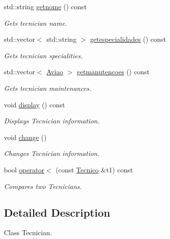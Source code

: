 \begin{DoxyCompactItemize}
std\+::string \hyperlink{class_tecnico_ac26bc8c39d4b0a174d3e7cacd53414aa}{getnome} () const
\begin{DoxyCompactList}\small\item\em Gets tecnician name. \end{DoxyCompactList}\item 
std\+::vector$<$ std\+::string $>$ \hyperlink{class_tecnico_ad481c5d2e8616a347b26dbd5df431fa1}{getespecialidades} () const
\begin{DoxyCompactList}\small\item\em Gets tecnician specialities. \end{DoxyCompactList}\item 
std\+::vector$<$ \hyperlink{class_aviao}{Aviao} $>$ \hyperlink{class_tecnico_abbc1049bcfe9772a1155730950b5736f}{getmanutencoes} () const
\begin{DoxyCompactList}\small\item\em Gets tecnician maintenances. \end{DoxyCompactList}\item 
\mbox{\label{class_tecnico_a1d349147fbe3e2947debcbfae6fc7d21}} 
void \hyperlink{class_tecnico_a1d349147fbe3e2947debcbfae6fc7d21}{display} () const
\begin{DoxyCompactList}\small\item\em Displays Tecnician information. \end{DoxyCompactList}\item 
void \hyperlink{class_tecnico_a6b628a20bb7c268776e26a29ca8b8a73}{change} ()
\begin{DoxyCompactList}\small\item\em Changes Tecnician information. \end{DoxyCompactList}\item 
bool \hyperlink{class_tecnico_a40d2c35c86d41d1410aa6ac930159644}{operator$<$} (const \hyperlink{class_tecnico}{Tecnico} \&t1) const
\begin{DoxyCompactList}\small\item\em Compares two Tecnicians. \end{DoxyCompactList}\end{DoxyCompactItemize}


\subsection{Detailed Description}
Class Tecnician. 


